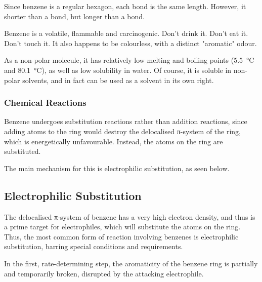 		Since benzene is a regular hexagon, each  bond is the same length. However, it shorter than a  bond, but longer
		than a  bond.

		Benzene is a volatile, flammable and carcinogenic. Don't drink it. Don't eat it. Don't touch it. It also happens to be colourless,
		with a distinct "aromatic" odour.

		As a non-polar molecule, it has relatively low melting and boiling points (\SI{5.5}{\celsius} and \SI{80.1}{\celsius}), as well as low
		solubility in water. Of course, it is soluble in non-polar solvents, and in fact can be used as a solvent in its own right.



	\subsubsection{Chemical Reactions}

		Benzene undergoes substitution reactions rather than addition reactions, since adding atoms to the ring would destroy the
		delocalised π-system of the ring, which is energetically unfavourable. Instead, the  atoms on the ring are substituted.

		The main mechanism for this is electrophilic substitution, as seen below.




\pagebreak
\subsection{Electrophilic Substitution}

	The delocalised π-system of benzene has a very high electron density, and thus is a prime target for electrophiles, which
	will substitute the  atoms on the ring. Thus, the most common form of reaction involving benzenes is electrophilic
	substitution, barring special conditions and requirements.


	\vspace{1.0em}

	In the first, rate-determining step, the aromaticity of the benzene ring is partially and temporarily broken, disrupted by
	the attacking electrophile.



